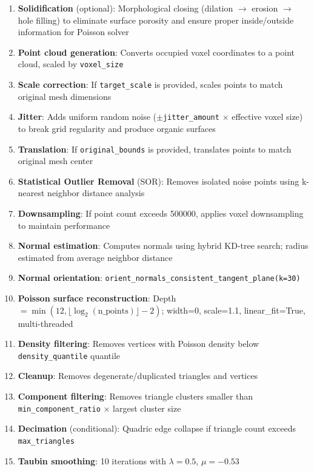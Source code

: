 \documentclass[12pt,a4paper]{article}
\begin{document}
\begin{enumerate}
  \item \textbf{Solidification} (optional): Morphological closing (dilation $\rightarrow$ erosion $\rightarrow$ hole filling) to eliminate surface porosity and ensure proper inside/outside information for Poisson solver
  \item \textbf{Point cloud generation}: Converts occupied voxel coordinates to a point cloud, scaled by \texttt{voxel\_size}
  \item \textbf{Scale correction}: If \texttt{target\_scale} is provided, scales points to match original mesh dimensions
  \item \textbf{Jitter}: Adds uniform random noise ($\pm$\texttt{jitter\_amount} $\times$ effective voxel size) to break grid regularity and produce organic surfaces
  \item \textbf{Translation}: If \texttt{original\_bounds} is provided, translates points to match original mesh center
  \item \textbf{Statistical Outlier Removal} (SOR): Removes isolated noise points using k-nearest neighbor distance analysis
  \item \textbf{Downsampling}: If point count exceeds 500000, applies voxel downsampling to maintain performance
  \item \textbf{Normal estimation}: Computes normals using hybrid KD-tree search; radius estimated from average neighbor distance
  \item \textbf{Normal orientation}: \texttt{orient\_normals\_consistent\_tangent\_plane(k=30)}
  \item \textbf{Poisson surface reconstruction}: Depth $= \min(12, \lfloor\log_2(\text{n\_points})\rfloor - 2)$; width=0, scale=1.1, linear\_fit=True, multi-threaded
  \item \textbf{Density filtering}: Removes vertices with Poisson density below \texttt{density\_quantile} quantile
  \item \textbf{Cleanup}: Removes degenerate/duplicated triangles and vertices
  \item \textbf{Component filtering}: Removes triangle clusters smaller than \texttt{min\_component\_ratio} $\times$ largest cluster size
  \item \textbf{Decimation} (conditional): Quadric edge collapse if triangle count exceeds \texttt{max\_triangles}
  \item \textbf{Taubin smoothing}: 10 iterations with $\lambda = 0.5$, $\mu = -0.53$
\end{enumerate}
\end{document}
